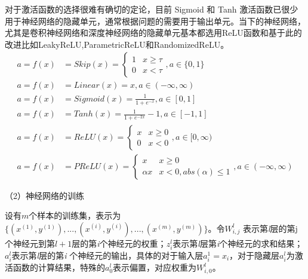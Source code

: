 对于激活函数的选择很难有确切的定论，目前 Sigmoid 和 Tanh 激活函数已很少用于神经网络的隐藏单元，通常根据问题的需要用于输出单元。当下的神经网络，尤其是卷积神经网络和深度神经网络的隐藏单元基本都选用ReLU函数和基于此的改进比如LeakyReLU,ParametricReLU和RandomizedReLU。
\begin{subequations}
\begin{align}
a = f(x) &= Skip(x) = \left\{\begin{matrix}
1 & x \geqslant \tau  \\ 
0 &  x < \tau  
\end{matrix}\right. , a \in \{0, 1\} \label{equ:gan-act-func-skip} \\
a = f(x) &= Linear(x)=x , a \in (-\infty, \infty) \label{equ:gan-act-func-identity}\\
a = f(x) &= Sigmoid(x) = \frac{1}{1+e^{-x}} \label{equ:gan-act-func-sigmoid}, a \in [0, 1] \\
a = f(x) &= Tanh(x) = \frac{1}{1+e^{-2x}} - 1 \label{equ:gan-act-func-tanh} , a \in [-1, 1] \\
a = f(x) &= ReLU(x) = \left\{\begin{matrix}
x & x \geqslant 0 \\ 
0 &  x < 0
\end{matrix}\right. , a \in [0, \infty) \label{equ:gan-act-func-relu}\\
a = f(x) &= PReLU(x) = \left\{\begin{matrix}
x & x \geqslant 0 \\ 
\alpha x &  x < 0, abs(\alpha) \leq 1
\end{matrix}\right. , a \in (-\infty, \infty) \label{equ:gan-act-func-parametric-relu}
\end{align}
\end{subequations}

（2）神经网络的训练

设有$m$个样本的训练集，表示为$\{(x^{(1)}, y^{(1)}), ..., (x^{(i)}, y^{(i)}), ..., (x^{(m)}, y^{(m)})\}$。令$W_{i,j}^{l}$ 表示第\emph{l}层的第j个神经元到第$l+1$层的第\emph{i}个神经元的权重；$z_{i}^{l}$表示第\emph{l}层第\emph{i}个神经元的求和结果；$a_{i}^{l}$表示第\emph{l}层的第\emph{i} 个神经元的输出，具体的对于输入层$a_{i}^{1} = x_{i}$，对于隐藏层$a_{i}^{l}$为激活函数的计算结果，特殊的$a_{0}^{l}$表示偏置，对应权重为$W_{i,0}^{l}$。

